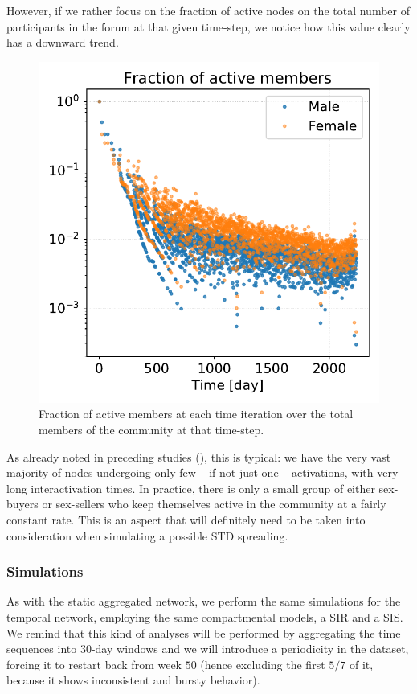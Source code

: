 \documentclass[a4paper,11pt, twocolumn]{article}
\begin{document}
However, if we rather focus on the fraction of active nodes on the total number of participants in the forum at that given time-step, we notice how this value clearly has a downward trend.
\begin{figure}[htp]
\centering
\includegraphics[scale=0.3]{./Figure/Static/Fraction_active_members.pdf}
\caption{Fraction of active members at each time iteration over the total members of the community at that time-step.}
\end{figure}

As already noted in preceding studies (\cite{rocha, internet_pros}), this is typical: we have the very vast majority of nodes undergoing only few -- if not just one -- activations, with very long interactivation times. In practice, there is only a small group of either sex-buyers or sex-sellers who keep themselves active in the community at a fairly constant rate. This is an aspect that will definitely need to be taken into consideration when simulating a possible STD spreading.

\subsubsection*{Simulations}
As with the static aggregated network, we perform the same simulations for the temporal network, employing the same compartmental models, a SIR and a SIS. We remind that this kind of analyses will be performed by aggregating the time sequences into 30-day windows and we will introduce a periodicity in the dataset, forcing it to restart back from week $50$ (hence excluding the first $5/7$ of it, because it shows inconsistent and bursty behavior).
\end{document}
